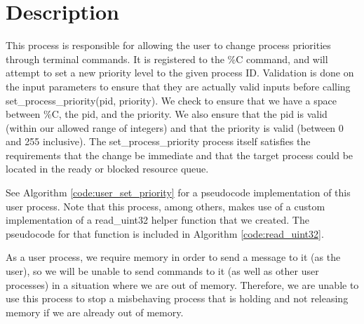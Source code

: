 \documentclass[12pt]{report}
\begin{document}
\section{Description}
    This process is responsible for allowing the user to change process
    priorities through terminal commands.  It is registered to the \%C command,
    and will attempt to set a new priority level to the given process ID.
    Validation is done on the input parameters to ensure that they are actually
    valid inputs before calling set\_process\_priority(pid, priority).  We check
    to ensure that we have a space between \%C, the pid, and the priority.  We
    also ensure that the pid is valid (within our allowed range of integers) and
    that the priority is valid (between 0 and 255 inclusive).  The
    set\_process\_priority process itself satisfies the requirements that the
    change be immediate and that the target process could be located in the
    ready or blocked resource queue.

    See Algorithm \ref{code:user_set_priority} for a pseudocode implementation
    of this user process.  Note that this process, among others, makes use of
    a custom implementation of a read\_uint32 helper function that we created.
    The pseudocode for that function is included in Algorithm
    \ref{code:read_uint32}.

    As a user process, we require memory in order to send a message to it (as
    the user), so we will be unable to send commands to it (as well as other
    user processes) in a situation where we are out of memory.  Therefore, we
    are unable to use this process to stop a misbehaving process that is holding
    and not releasing memory if we are already out of memory.
\end{document}
